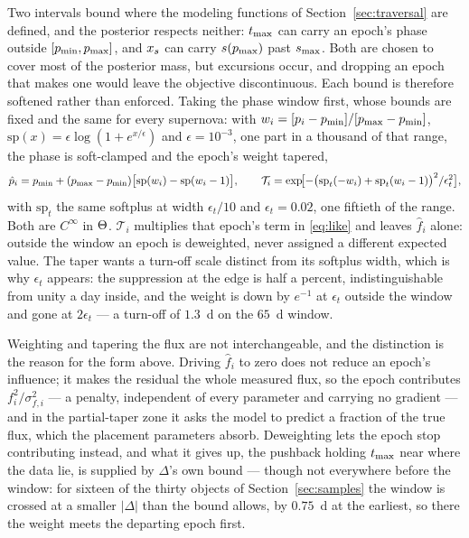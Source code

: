 \documentclass[11pt]{article}
\theoremstyle{plain}
\begin{document}
Two intervals bound where the modeling functions of Section~\ref{sec:traversal} are
defined, and the posterior respects neither: $t_{\mathrm{max}}$ can carry an epoch's phase outside
$[p_{\min}, p_{\max}]$, and $x_{s}$ can carry $s(p_{\max})$ past
$s_{\max}$. Both are chosen to cover most of the posterior mass, but excursions occur, and
dropping an epoch that makes one would leave the objective discontinuous. Each bound is
therefore softened rather than enforced. Taking the phase window first, whose bounds are
fixed and the same for every supernova: with
$w_{i} = [p_{i} - p_{\min}]/[p_{\max} - p_{\min}]$,
$\mathrm{sp}(x) = \epsilon\log(1 + e^{x/\epsilon})$ and $\epsilon = 10^{-3}$, one part in a
thousand of that range, the phase is soft-clamped and the epoch's weight tapered,
\begin{equation}
  \hat{p}_{i} = p_{\min} + (p_{\max} - p_{\min})
    \bigl[\mathrm{sp}(w_{i}) - \mathrm{sp}(w_{i}-1)\bigr] ,
  \qquad
  \mathcal{T}_{i} =
    \exp\!\bigl[-\bigl(\mathrm{sp}_{t}(-w_{i}) + \mathrm{sp}_{t}(w_{i}-1)\bigr)^{2}
      /\epsilon_{t}^{2}\bigr] ,
  \label{eq:soft}
\end{equation}
with $\mathrm{sp}_{t}$ the same softplus at width $\epsilon_{t}/10$ and
$\epsilon_{t} = 0.02$, one fiftieth of the range. Both are $C^{\infty}$ in $\Theta$.
$\mathcal{T}_{i}$ multiplies that epoch's term in \eqref{eq:like} and leaves
$\hat f_{i}$ alone: outside the window an epoch is deweighted, never assigned a different
expected value. The taper wants a turn-off scale distinct from its softplus width, which is
why $\epsilon_{t}$ appears: the suppression at the edge is half a percent,
indistinguishable from unity a day inside, and the weight is down by $e^{-1}$ at
$\epsilon_{t}$ outside the window and gone at $2\epsilon_{t}$ --- a turn-off of $1.3$~d on
the $65$~d window.

Weighting and tapering the flux are not interchangeable, and the distinction is the reason
for the form above. Driving $\hat f_{i}$ to zero does not reduce an epoch's influence; it
makes the residual the whole measured flux, so the epoch contributes
$f_{i}^{2}/\sigma_{f,i}^{2}$ --- a penalty, independent of every parameter and carrying no
gradient --- and in the partial-taper zone it asks the model to predict a fraction of the
true flux, which the placement parameters absorb. Deweighting lets the epoch stop
contributing instead, and what it gives up, the pushback holding $t_{\mathrm{max}}$ near where the
data lie, is supplied by $\Delta$'s own bound --- though not everywhere before the window:
for sixteen of the thirty objects of Section~\ref{sec:samples} the window is crossed at a
smaller $|\Delta|$ than the bound allows, by $0.75$~d at the earliest, so there the weight
meets the departing epoch first.
\end{document}
